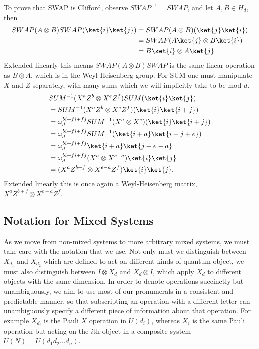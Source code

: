 To prove that SWAP is Clifford, observe $SWAP^{-1} = SWAP$, and let $A, B \in H_d$, then
\begin{align*}
SWAP (A \otimes B) SWAP (\ket{i}\ket{j})
&= SWAP (A \otimes B)(\ket{j}\ket{i})
\\&=SWAP (A\ket{j} \otimes B\ket{i})
\\&=B\ket{i} \otimes A\ket{j}
\end{align*}
Extended linearly this means $SWAP (A \otimes B) SWAP$ is the same linear operation as $B \otimes A$, which is in the Weyl-Heisenberg group. For SUM one must manipulate $X$ and $Z$ separately, with many sums which we will implicitly take to be mod $d$.
\begin{align*}
&SUM^{-1} (X^aZ^b \otimes X^eZ^f) SUM (\ket{i}\ket{j})
\\&=SUM^{-1} (X^aZ^b \otimes X^eZ^f) (\ket{i}\ket{i+j})
\\&=\omega_d^{bi+fi+fj}SUM^{-1}(X^a \otimes X^e) (\ket{i}\ket{i+j})
\\&=\omega_d^{bi+fi+fj}SUM^{-1} (\ket{i+a}\ket{i+j+e})
\\&=\omega_d^{bi+fi+fj}\ket{i+a}\ket{j+e-a}
\\&=\omega_d^{bi+fi+fj}(X^a \otimes X^{e-a})\ket{i}\ket{j}
\\&=(X^aZ^{b+f} \otimes X^{e-a}Z^f)\ket{i}\ket{j}.
\end{align*}
Extended linearly this is once again a Weyl-Heisenberg matrix, $X^aZ^{b+f} \otimes X^{e-a}Z^f$.

\subsection{Notation for Mixed Systems}\label{notation}
As we move from non-mixed systems to more arbitrary mixed systems, we must take care with the notation that we use. Not only must we distinguish between $X_{d_1}$ and $X_{d_2}$ which are defined to act on different kinds of quantum object, we must also distinguish between $I \otimes X_d$ and $X_d \otimes I$, which apply $X_d$ to different objects with the same dimension. In order to denote operations succinctly but unambiguously, we aim to use most of our pronumerals in a consistent and predictable manner, so that subscripting an operation with a different letter can unambiguously specify a different piece of information about that operation. For example $X_{d_i}$ is the Pauli $X$ operation in $U(d_i)$, whereas $X_i$ is the same Pauli operation but acting on the $i$th object in a composite system $U(N) = U(d_1d_2\dots d_n)$.

